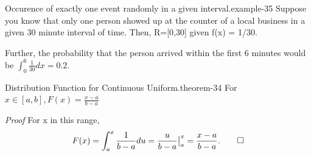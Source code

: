 \documentclass[10pt,]{book}
\makeatletter
\renewcommand*{\proofname}{Proof}
\renewenvironment{proof}[1][\proofname]{\par
  \pushQED{\qed}%
  \normalfont \topsep6\p@\@plus6\p@\relax
  \trivlist
  \item\relax
    {\itshape
    #1\@addpunct{.}}\hspace\labelsep\ignorespaces
}{%
  \popQED\endtrivlist\@endpefalse
}
\numberwithin{equation}{section}
\makeatother
\begin{document}
%
\par
\hypertarget{p-829}{}%
\begin{example}{Occurence of exactly one event randomly in a given interval.}{example-35}%
\hypertarget{p-830}{}%
Suppose you know that only one person showed up at the counter of a local business in a given 30 minute interval of time. Then, R=[0,30] given f(x) = 1/30.%
\par
\hypertarget{p-831}{}%
Further, the probability that the person arrived within the first 6 minutes would be \(\int_0^6 \frac{1}{30} dx = 0.2\).%
\end{example}
%
\par
\hypertarget{p-832}{}%
\begin{theorem}{Distribution Function for Continuous Uniform.}{}{theorem-34}%
\hypertarget{p-833}{}%
For \(x \in [a,b], F(x) = \frac{x-a}{b-a}\)%
\end{theorem}
\begin{proof}\hypertarget{proof-37}{}
\hypertarget{p-834}{}%
For x in this range,%
\begin{equation*}
F(x) = \int_a^x \frac{1}{b-a} du = \frac{u}{b-a} \big |_a^x = \frac{x-a}{b-a}.\qedhere
\end{equation*}
%
\end{proof}
%
%
%
\typeout{************************************************}
\typeout{************************************************}
%
\end{document}
